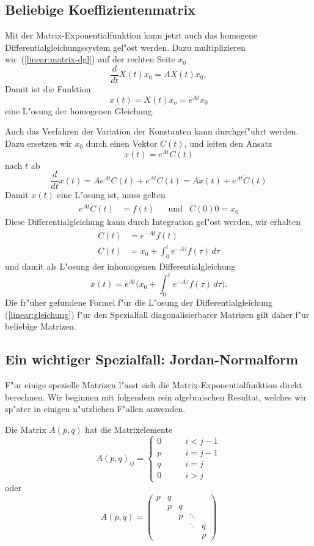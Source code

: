 \subsection{Beliebige Koeffizientenmatrix}
Mit der Matrix-Exponentialfunktion kann jetzt auch das homogene
Differentialgleichungssystem gel"ost werden.
Dazu multiplizieren wir~(\ref{linear:matrix-dgl}) auf der rechten Seite
$x_0$ 
\[
\frac{d}{dt}X(t)x_0 = A X(t)x_0,
\]
Damit ist die Funktion
\[
x(t)=X(t)x_o = e^{At}x_0
\]
eine L"osung der homogenen Gleichung.

Auch das Verfahren der Variation der Konstanten kann durchgef"uhrt werden.
Dazu ersetzen wir $x_0$ durch einen Vektor $C(t)$, und leiten den Ansatz
\[
x(t)=e^{At}C(t)
\]
nach $t$ ab
\[
\frac{d}{dt}x(t)
=
Ae^{At}C(t) + e^{At}\dot{C}(t)
=
A x(t) + e^{At}\dot{C}(t)
\]
Damit $x(t)$ eine L"osung ist, muss gelten
\[
\begin{aligned}
e^{At}\dot{C}(t)
&=
f(t)
&&\text{und}
&
C(0)0=x_0
\end{aligned}
\]
Diese Differentialgleichung kann durch Integration gel"ost werden,
wir erhalten
\begin{align*}
\dot{C}(t)
&=
e^{-At}f(t)
\\
C(t)
&=
x_0+\int_0^t e^{-A\tau}f(\tau)\,d\tau
\end{align*}
und damit als L"osung der inhomogenen Differentialgleichung
\[
x(t)
=
e^{At}\biggl(
x_0+\int_0^t e^{-A\tau}f(\tau)\,d\tau
\biggr).
\]
Die fr"uher gefundene Formel f"ur die L"osung der Differentialgleichung
(\ref{linear:gleichung}) f"ur den Spezialfall diagonalisierbarer 
Matrizen gilt daher f"ur beliebige Matrizen.

\subsection{Ein wichtiger Spezialfall: Jordan-Normalform}
F"ur einige spezielle Matrizen l"asst sich die Matrix-Exponentialfunktion
direkt berechnen.
Wir beginnen mit folgendem rein algebraischen Resultat, welches wir
sp"ater in einigen n"utzlichen F"allen anwenden.

\begin{definition}
Die Matrix $A(p,q)$ hat die Matrixelemente
\begin{equation}
A(p,q)_{ij}
=
\begin{cases}
0&\qquad i < j-1\\
p&\qquad i = j-1\\
q&\qquad i = j\\
0&\qquad i > j
\end{cases}
\label{linear:apqmatrixelement}
\end{equation}
oder
\begin{equation}
A(p,q)=\begin{pmatrix}
p&q& &      & \\
 &p&q&      & \\
 & &p&\ddots& \\
 & & &\ddots&q\\
 & & &      &p
\end{pmatrix}
\label{linear:apqmatrix}
\end{equation}
\end{definition}

